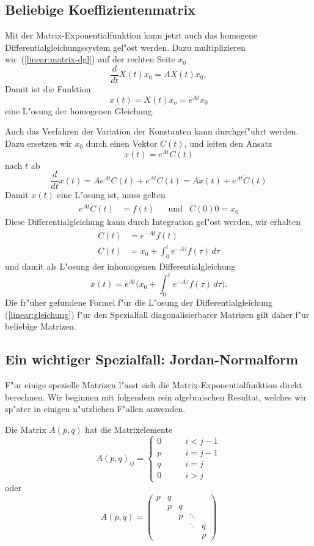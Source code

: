 \subsection{Beliebige Koeffizientenmatrix}
Mit der Matrix-Exponentialfunktion kann jetzt auch das homogene
Differentialgleichungssystem gel"ost werden.
Dazu multiplizieren wir~(\ref{linear:matrix-dgl}) auf der rechten Seite
$x_0$ 
\[
\frac{d}{dt}X(t)x_0 = A X(t)x_0,
\]
Damit ist die Funktion
\[
x(t)=X(t)x_o = e^{At}x_0
\]
eine L"osung der homogenen Gleichung.

Auch das Verfahren der Variation der Konstanten kann durchgef"uhrt werden.
Dazu ersetzen wir $x_0$ durch einen Vektor $C(t)$, und leiten den Ansatz
\[
x(t)=e^{At}C(t)
\]
nach $t$ ab
\[
\frac{d}{dt}x(t)
=
Ae^{At}C(t) + e^{At}\dot{C}(t)
=
A x(t) + e^{At}\dot{C}(t)
\]
Damit $x(t)$ eine L"osung ist, muss gelten
\[
\begin{aligned}
e^{At}\dot{C}(t)
&=
f(t)
&&\text{und}
&
C(0)0=x_0
\end{aligned}
\]
Diese Differentialgleichung kann durch Integration gel"ost werden,
wir erhalten
\begin{align*}
\dot{C}(t)
&=
e^{-At}f(t)
\\
C(t)
&=
x_0+\int_0^t e^{-A\tau}f(\tau)\,d\tau
\end{align*}
und damit als L"osung der inhomogenen Differentialgleichung
\[
x(t)
=
e^{At}\biggl(
x_0+\int_0^t e^{-A\tau}f(\tau)\,d\tau
\biggr).
\]
Die fr"uher gefundene Formel f"ur die L"osung der Differentialgleichung
(\ref{linear:gleichung}) f"ur den Spezialfall diagonalisierbarer 
Matrizen gilt daher f"ur beliebige Matrizen.

\subsection{Ein wichtiger Spezialfall: Jordan-Normalform}
F"ur einige spezielle Matrizen l"asst sich die Matrix-Exponentialfunktion
direkt berechnen.
Wir beginnen mit folgendem rein algebraischen Resultat, welches wir
sp"ater in einigen n"utzlichen F"allen anwenden.

\begin{definition}
Die Matrix $A(p,q)$ hat die Matrixelemente
\begin{equation}
A(p,q)_{ij}
=
\begin{cases}
0&\qquad i < j-1\\
p&\qquad i = j-1\\
q&\qquad i = j\\
0&\qquad i > j
\end{cases}
\label{linear:apqmatrixelement}
\end{equation}
oder
\begin{equation}
A(p,q)=\begin{pmatrix}
p&q& &      & \\
 &p&q&      & \\
 & &p&\ddots& \\
 & & &\ddots&q\\
 & & &      &p
\end{pmatrix}
\label{linear:apqmatrix}
\end{equation}
\end{definition}

